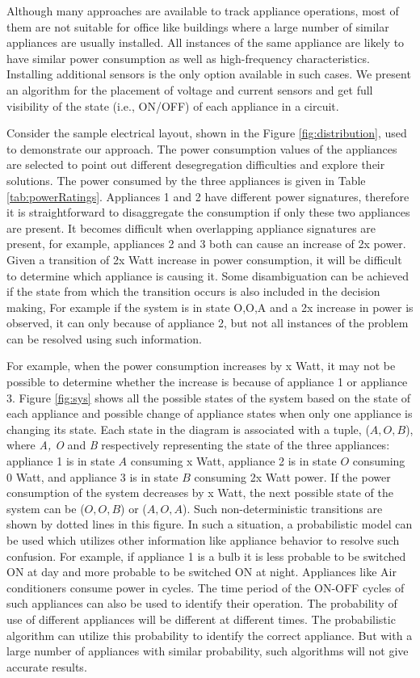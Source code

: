 Although many approaches are available to track appliance operations, most of them are not suitable for office like buildings where a large number of similar appliances are usually installed. All instances of the same appliance are likely to have similar power consumption as well as high-frequency characteristics.
Installing additional sensors is the only option available in such cases. We  present an algorithm for the placement of voltage and current sensors and get full visibility of the state (i.e., ON/OFF) of each appliance in a circuit.

Consider the sample electrical layout, shown in the Figure \ref{fig:distribution}, used to demonstrate our approach.
The power consumption values of the appliances are selected to point out different desegregation difficulties and explore their solutions.
The power consumed by the three appliances is given in Table \ref{tab:powerRatings}. Appliances 1 and 2 have different power signatures, therefore it is straightforward to disaggregate the consumption if only these two appliances are present. It becomes difficult when overlapping appliance signatures are present, for example, appliances 2 and 3 both can cause an increase of 2x power. Given a transition of 2x Watt increase in power consumption, it will be difficult to determine which appliance is causing it. Some disambiguation can be achieved if the state from which the transition occurs is also included in the decision making, For example if the system is in state O,O,A and a 2x increase in power is observed, it can only because of appliance 2, but not all instances of the problem can be resolved using such information.

For example, when the power consumption increases by x Watt, it may not be possible to determine whether the increase is because of appliance 1 or appliance 3.
Figure \ref{fig:sys} shows all the possible states of the system based on the state of each appliance and possible change of appliance states when only one appliance is changing its state.
Each state in the diagram is associated with a tuple, ($A,O,B$), where \textit{A, O} and \textit{B} respectively representing the state of the three appliances: appliance 1 is in state $A$ consuming x Watt, appliance 2 is in state $O$ consuming 0 Watt, and appliance 3 is in state $B$ consuming 2x Watt power. If the power consumption of the system decreases by x Watt, the next possible state of the system can be ($O,O,B$) or ($A,O,A$). Such non-deterministic transitions are shown by dotted lines in this figure.
In such a situation, a probabilistic model can be used which utilizes other information like appliance behavior to resolve such confusion. For example, if appliance 1 is a bulb it is less probable to be switched ON at day and more probable to be switched ON at night. Appliances like Air conditioners consume power in cycles. The time period of the ON-OFF cycles of such appliances can also be used to identify their operation. The probability of use of different appliances will be different at different times. The probabilistic algorithm can utilize this probability to identify the correct appliance. But with a large number of appliances with  similar probability, such algorithms will not give accurate results.
